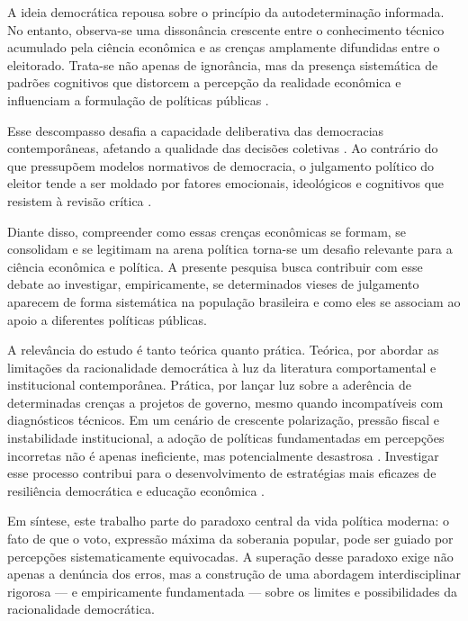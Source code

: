 A ideia democrática repousa sobre o princípio da autodeterminação informada. No entanto, observa-se uma dissonância crescente entre o conhecimento técnico acumulado pela ciência econômica e as crenças amplamente difundidas entre o eleitorado. Trata-se não apenas de ignorância, mas da presença sistemática de padrões cognitivos que distorcem a percepção da realidade econômica e influenciam a formulação de políticas públicas \cite{The_Myth_of_the_Rational_Voter,Judgment_under_Uncertainty}.

Esse descompasso desafia a capacidade deliberativa das democracias contemporâneas, afetando a qualidade das decisões coletivas \cite{downs1957economic}. Ao contrário do que pressupõem modelos normativos de democracia, o julgamento político do eleitor tende a ser moldado por fatores emocionais, ideológicos e cognitivos que resistem à revisão crítica \cite{kahneman2011thinking,kahan2012polarization}.

Diante disso, compreender como essas crenças econômicas se formam, se consolidam e se legitimam na arena política torna-se um desafio relevante para a ciência econômica e política. A presente pesquisa busca contribuir com esse debate ao investigar, empiricamente, se determinados vieses de julgamento aparecem de forma sistemática na população brasileira e como eles se associam ao apoio a diferentes políticas públicas.

A relevância do estudo é tanto teórica quanto prática. Teórica, por abordar as limitações da racionalidade democrática à luz da literatura comportamental e institucional contemporânea. Prática, por lançar luz sobre a aderência de determinadas crenças a projetos de governo, mesmo quando incompatíveis com diagnósticos técnicos. Em um cenário de crescente polarização, pressão fiscal e instabilidade institucional, a adoção de políticas fundamentadas em percepções incorretas não é apenas ineficiente, mas potencialmente desastrosa \cite{schumpeter1976capitalism,taleb2014antifragile}. Investigar esse processo contribui para o desenvolvimento de estratégias mais eficazes de resiliência democrática e educação econômica \cite{franco2022cartas,zaller1992nature}.

Em síntese, este trabalho parte do paradoxo central da vida política moderna: o fato de que o voto, expressão máxima da soberania popular, pode ser guiado por percepções sistematicamente equivocadas. A superação desse paradoxo exige não apenas a denúncia dos erros, mas a construção de uma abordagem interdisciplinar rigorosa — e empiricamente fundamentada — sobre os limites e possibilidades da racionalidade democrática.


